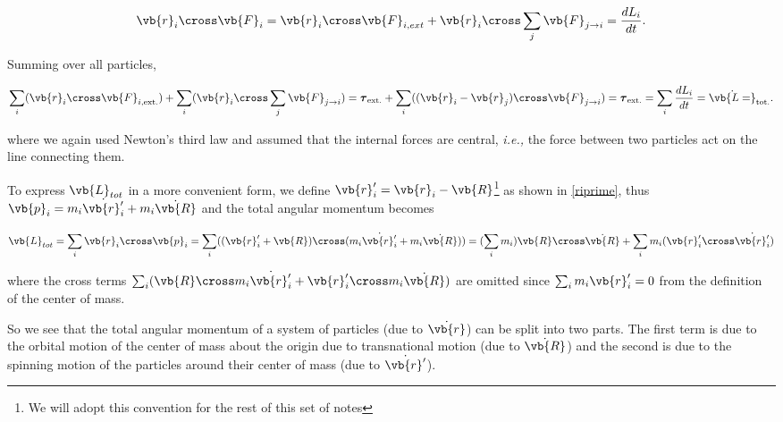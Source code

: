 \documentclass[a4paper,12pt]{report}
\begin{document}
\begin{equation}
	 \vb{r }_{i}  \cross \vb{F} _{i} = \vb{r} _{i} \cross \vb{F} _{i, ext} + \vb{r} _{i} \cross \sum_{j}^{} \vb{F} _{j \rightarrow i} = \frac{dL_{i} }{dt}. 
\end{equation}

Summing over all particles, 

\begin{equation}
	\sum_{i}^{} (\vb{r} _{i} \cross \vb{F} _{i,\text{ext.} }) + \sum_{i}^{} (\vb{r} _{i} \cross \sum_{j}^{} \vb{F} _{j \rightarrow i}) = \boldsymbol{\tau }_{\text{ext.} }  + \sum_{i}^{} ((\vb{r} _{i} - \vb{r} _{j} ) \cross  \vb{F} _{j \rightarrow  i } ) = \boldsymbol{\tau } _{\text{ext.} } = \sum_{i}^{} \frac{dL_{i} }{dt}  = \dot{\vb{L=}}_{\text{tot.} } . 
\end{equation}

where we again used Newton's third law and assumed that the internal forces are central, \textit{i.e.,} the force between two particles act on the line connecting them.

To express \(\vb{L} _{tot} \) in a more convenient form, we define \(\vb{r}'_{i} = \vb{r} _{i} - \vb{R}  \)\footnote{We will adopt this convention for the rest of this set of notes}  as shown in \cref{riprime}, thus \(\vb{p} _{i} = m_{i}\dot{\vb{r} '_{i} }  + m_{i} \dot{\vb{R} }  \) and the total angular momentum becomes 


\begin{equation}
	\vb{L} _{tot} = \sum_{i}^{} \vb{r} _{i} \cross \vb{p} _{i} = \sum_{i}^{}  ((\vb{r} '_{i} + \vb{R} ) \cross (m_{i}\dot{\vb{r} '_{i} }  + m_{i} \dot{\vb{R} } )) = (\sum_{i}^{} m_{i}) \vb{R} \cross \dot{\vb{R} } + \sum_{i}^{} m_{i} (\vb{r} '_{i} \cross \dot{\vb{r} '_{i} } )  \label{L1}   
\end{equation}

where the cross terms \(\sum_{i}^{} (\vb{R} \cross m_{i} \dot{\vb{r} '_{i} }  + \vb{r} '_{i} \cross m_{i}  \dot{\vb{R} } ) \) are omitted since \(\sum_{i}^{} m_{i} \vb{r} '_{i} = 0 \) from the definition of the center of mass.

So we see that the total angular momentum of a system of particles (due to \(\dot{\vb{r} } \))  can be split into two parts. The first term is due to the orbital motion of the center of mass about the origin due to transnational motion (due to \(\dot{\vb{R} } \))  and the second is due to the spinning motion of the particles around their center of mass (due to \(\dot{\vb{r} '} \)).
\end{document}
